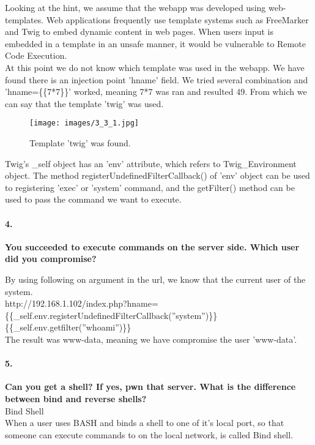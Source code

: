 \documentclass[12pt]{report}
\begin{document}
	Looking at the hint, we assume that the webapp was developed using web-templates. Web applications frequently use template systems such as FreeMarker and Twig to embed dynamic content in web pages. When users input is embedded in a template in an unsafe manner, it would be vulnerable to Remote Code Execution.\\
	
	At this point we do not know which template was used in the webapp. We have found there is an injection point 'hname' field. We tried several combination and 'hname=\{\{7*7\}\}' worked, meaning 7*7 was ran and resulted 49. From which we can say that the template 'twig' was used.
	
	\begin{figure}[H]
		\texttt{[image: images/3\_3\_1.jpg]}
		\caption{Template 'twig' was found.}
	\end{figure}

	Twig's {\sf \_self} object has an {\sf 'env'} attribute, which refers to {\sf Twig\_Environment} object. The method {\sf registerUndefinedFilterCallback()} of {\sf 'env'} object can be used to registering {\sf 'exec'} or {\sf 'system'} command, and the {\sf getFilter()} method can be used to pass the command we want to execute.\\
	
	\paragraph*{4.}{\bf You succeeded to execute commands on the server side. Which user did you compromise?}
	
	By using following on argument in the url, we know that the current user of the system.\\
	{\sf http://192.168.1.102/index.php?hname=\{\{\_self.env.registerUndefinedFilterCallback(''system'')\}\} \{\{\_self.env.getfilter(''whoami'')\}\}}\\
	
	The result was {\sf www-data}, meaning we have compromise the user 'www-data'.
	
	\paragraph*{5.}{\bf Can you get a shell? If yes, pwn that server. What is the difference between bind and reverse shells?}\\
	
	Bind Shell\\
	When a user uses BASH and binds a shell to one of it's local port, so that someone can execute commands to on the local network, is called Bind shell.\\
	
\end{document}
